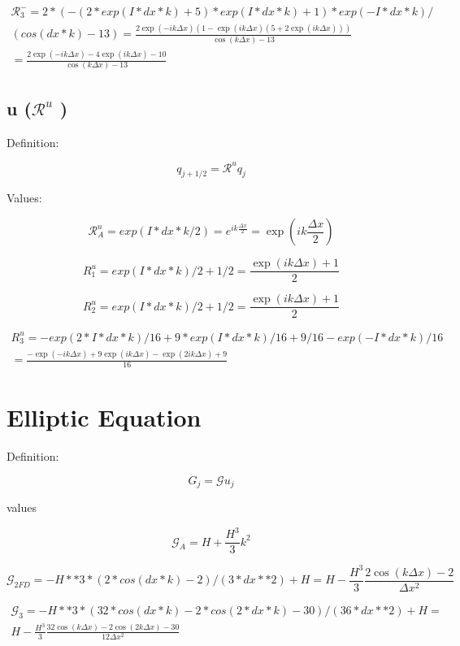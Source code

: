 \documentclass[12pt]{article}
\begin{document}
\begin{multline}
\mathcal{R}^-_3 = 2*(-(2*exp(I*dx*k) + 5)*exp(I*dx*k) + 1)*exp(-I*dx*k) / \\
(cos(dx*k) - 13) = \frac{2 \exp\left(-i k \Delta x\right)\left(1 - \exp\left(i k \Delta x\right)\left(5 + 2\exp\left(i k \Delta x\right) \right)\right)}{\cos\left(k \Delta x\right) - 13} \\  = \frac{2 \exp\left(-i k \Delta x\right) - 4\exp\left(i k \Delta x\right) - 10}{\cos\left(k \Delta x\right) - 13}
\end{multline}

\subsection{u ($\mathcal{R}^u$ )}

Definition:

\[q_{j+1/2} = \mathcal{R}^u q_j\]


Values:

\[\mathcal{R}^u_A = exp(I*dx*k/2) = e^{i k \frac{\Delta x}{2}} = \exp\left(i k \frac{\Delta x}{2}\right)\]

\[R^u_1 = exp(I*dx*k)/2 + 1/2 = \frac{\exp\left(i k \Delta x\right) + 1}{2} \]

\[R^u_2 = exp(I*dx*k)/2 + 1/2 = \frac{\exp\left(i k \Delta x\right) + 1}{2} \]

\begin{multline}
R^u_3 = -exp(2*I*dx*k)/16 + 9*exp(I*dx*k)/16 + 9/16 - exp(-I*dx*k)/16  \\= \frac{-\exp\left(-ik \Delta x\right) + 9 \exp\left(ik \Delta x\right) -\exp\left(2ik \Delta x\right) + 9}{16}
\end{multline}

\section{Elliptic Equation}

Definition:

\[G_{j} = \mathcal{G} u_j\]

values

\[\mathcal{G}_A = H + \frac{H^3}{3}k^2\]

\[\mathcal{G}_{2FD} = -H**3*(2*cos(dx*k) - 2)/(3*dx**2) + H = H - \frac{H^3}{3}\frac{2\cos\left(k \Delta x\right) -2}{\Delta x^2}\]

\begin{multline}
\mathcal{G}_3 = -H**3*(32*cos(dx*k) - 2*cos(2*dx*k) - 30)/(36*dx**2) + H = \\ H - \frac{H^3}{3}\frac{32\cos\left(k \Delta x\right) -2\cos\left(2k \Delta x\right) - 30}{12 \Delta x^2}
\end{multline}
\end{document}
